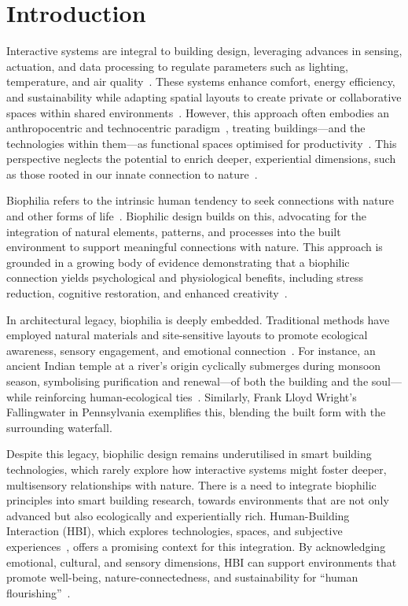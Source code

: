 \section{Introduction}
\label{sec:ch4-introduction}
Interactive systems are integral to building design, leveraging advances in sensing, actuation, and data processing to regulate parameters such as lighting, temperature, and air quality~\cite{alavi2017comfort}. These systems enhance comfort, energy efficiency, and sustainability while adapting spatial layouts to create private or collaborative spaces within shared environments~\cite{nguyen2022towards, nguyen2024adaptive, deng2019diffusive}. However, this approach often embodies an anthropocentric and technocentric paradigm~\cite{gill2008rethinking}, treating buildings---and the technologies within them---as functional spaces optimised for productivity~\cite{heidegger2006building}. This perspective neglects the potential to enrich deeper, experiential dimensions, such as those rooted in our innate connection to nature~\cite{wilson1986biophilia, kellert1995biophilia, kellert2018nature}.


Biophilia refers to the intrinsic human tendency to seek connections with nature and other forms of life~\cite{wilson1986biophilia}. Biophilic design builds on this, advocating for the integration of natural elements, patterns, and processes into the built environment to support meaningful connections with nature. This approach is grounded in a growing body of evidence demonstrating that a biophilic connection yields psychological and physiological benefits, including stress reduction, cognitive restoration, and enhanced creativity~\cite{frumkin2017nature, hartig2014nature}.


In architectural legacy, biophilia is deeply embedded. Traditional methods have employed natural materials and site-sensitive layouts to promote ecological awareness, sensory engagement, and emotional connection~\cite{browning2020nature, kellert2018nature}. For instance, an ancient Indian temple at a river’s origin cyclically submerges during monsoon season, symbolising purification and renewal---of both the building and the soul---while reinforcing human-ecological ties~\cite{geva2023water}. Similarly, Frank Lloyd Wright’s Fallingwater in Pennsylvania exemplifies this, blending the built form with the surrounding waterfall.

Despite this legacy, biophilic design remains underutilised in smart building technologies, which rarely explore how interactive systems might foster deeper, multisensory relationships with nature. There is a need to integrate biophilic principles into smart building research, towards environments that are not only advanced but also ecologically and experientially rich. Human-Building Interaction (HBI), which explores technologies, spaces, and subjective experiences~\cite{alavi2019introduction, becerik2022field, rao2023towards}, offers a promising context for this integration. By acknowledging emotional, cultural, and sensory dimensions, HBI can support environments that promote well-being, nature-connectedness, and sustainability for ``human flourishing''~\cite{mccormack2014no}.

